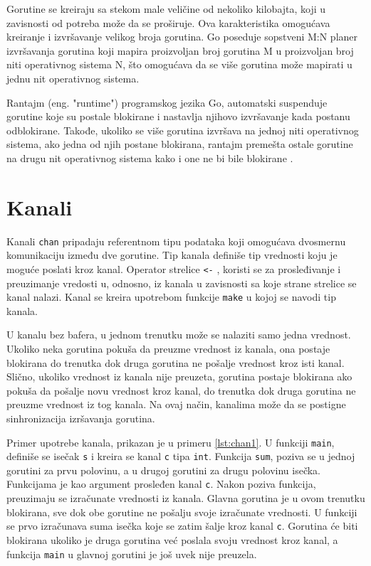 \documentclass[12pt,oneside]{memoir}
\begin{document}
Gorutine se kreiraju sa stekom male veličine od nekoliko kilobajta, koji u zavisnosti od potreba može da se proširuje. Ova karakteristika omogućava kreiranje i izvršavanje velikog broja gorutina. Go poseduje sopstveni M:N planer izvršavanja gorutina koji mapira proizvoljan broj gorutina M u proizvoljan broj niti operativnog sistema N, što omogućava da se više gorutina može mapirati u jednu nit operativnog sistema. 

Rantajm (eng. "runtime") programskog jezika Go, automatski suspenduje gorutine koje su postale blokirane i nastavlja njihovo izvršavanje kada postanu odblokirane. Takođe, ukoliko se više gorutina izvršava na jednoj niti operativnog sistema, ako jedna od njih postane blokirana, rantajm premešta ostale gorutine na drugu nit operativnog sistema kako i one ne bi bile blokirane \cite{bookConc}. 

\section{Kanali} \label{chanel}

Kanali \texttt{chan} pripadaju referentnom tipu podataka koji omogućava dvosmernu komunikaciju između dve gorutine. Tip kanala definiše tip vrednosti koju je moguće poslati kroz kanal. Operator strelice \texttt{<-} , koristi se za prosleđivanje i preuzimanje vredosti u, odnosno, iz kanala u zavisnosti sa koje strane strelice se kanal nalazi. Kanal se kreira upotrebom funkcije \texttt{make} u kojoj se navodi tip kanala.

U kanalu bez bafera, u jednom trenutku može se nalaziti samo jedna vrednost. Ukoliko neka gorutina pokuša da preuzme vrednost iz kanala, ona postaje blokirana do trenutka dok druga gorutina ne pošalje vrednost kroz isti kanal. Slično, ukoliko vrednost iz kanala nije preuzeta, gorutina postaje blokirana ako pokuša da pošalje novu vrednost kroz kanal, do trenutka dok druga gorutina ne preuzme vrednost iz tog kanala. Na ovaj način, kanalima može da se postigne sinhronizacija izršavanja gorutina.

Primer upotrebe kanala, prikazan je u primeru \ref{lst:chan1}. U funkciji \texttt{main}, definiše se isečak \texttt{s} i kreira se kanal \texttt{c} tipa \texttt{int}. Funkcija \texttt{sum}, poziva se u jednoj gorutini za prvu polovinu, a u drugoj gorutini za drugu polovinu isečka. Funkcijama je kao argument prosleđen kanal \texttt{c}. Nakon poziva funkcija, preuzimaju se izračunate vrednosti iz kanala. Glavna gorutina je u ovom trenutku blokirana, sve dok obe gorutine ne pošalju svoje izračunate vrednosti. U funkciji se prvo izračunava suma isečka koje se zatim šalje kroz kanal \texttt{c}. Gorutina će biti blokirana ukoliko je druga gorutina već poslala svoju vrednost kroz kanal, a  funkcija \texttt{main} u glavnoj gorutini je još uvek nije preuzela. 
\end{document}
